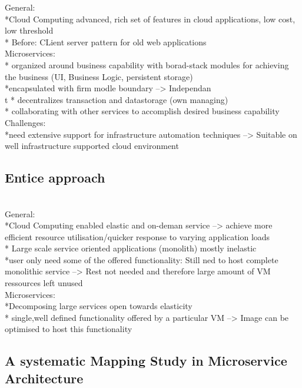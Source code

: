 General: \\
*Cloud Computing advanced, rich set of features in cloud applications, low cost, low threshold\\
* Before: CLient server pattern for old web applications\\

Microservices:\\
* organized around business capability with borad-stack modules for achieving the business (UI, Business Logic, persistent storage)\\
*encapsulated with firm modle boundary --> Independan\\t
* decentralizes transaction and datastorage (own  managing)\\
* collaborating with other services to accomplish  desired business capability\\


Challenges:\\
*need extensive support for infrastructure automation techniques --> Suitable on well infrastructure supported cloud environment\\

\subsection{Entice approach}
\cite{EnticeApproach} \\

General:\\
*Cloud Computing enabled elastic and on-deman service --> achieve more efficient resource utilisation/quicker response to varying application loads\\
* Large scale service oriented applications (monolith) mostly inelastic\\
*user only need some of the offered functionality: Still ned to host complete monolithic service --> Rest not needed and therefore large amount of VM ressources left unused\\


Microservices:\\
*Decomposing large services open towards elasticity\\
* single,well defined functionality  offered by a particular VM --> Image can be optimised to host this functionality\\

\subsection{A systematic Mapping Study in Microservice Architecture}
\cite{SystematicMappingStudyMicroservice} \\

